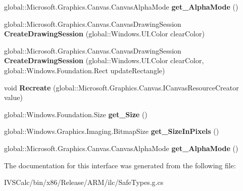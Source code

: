 \begin{DoxyCompactItemize}
global\+::\+Microsoft.\+Graphics.\+Canvas.\+Canvas\+Alpha\+Mode {\bfseries get\+\_\+\+Alpha\+Mode} ()
\item 
\mbox{\label{interface_microsoft_1_1_graphics_1_1_canvas_1_1_u_i_1_1_xaml_1_1_i_canvas_image_source_a2712dc7b5d96ee15e13c5e52958f1cd4}} 
global\+::\+Microsoft.\+Graphics.\+Canvas.\+Canvas\+Drawing\+Session {\bfseries Create\+Drawing\+Session} (global\+::\+Windows.\+U\+I.\+Color clear\+Color)
\item 
\mbox{\label{interface_microsoft_1_1_graphics_1_1_canvas_1_1_u_i_1_1_xaml_1_1_i_canvas_image_source_abc05c809912de3ae92ccfebc505385d6}} 
global\+::\+Microsoft.\+Graphics.\+Canvas.\+Canvas\+Drawing\+Session {\bfseries Create\+Drawing\+Session} (global\+::\+Windows.\+U\+I.\+Color clear\+Color, global\+::\+Windows.\+Foundation.\+Rect update\+Rectangle)
\item 
\mbox{\label{interface_microsoft_1_1_graphics_1_1_canvas_1_1_u_i_1_1_xaml_1_1_i_canvas_image_source_a15fd97a0021f7ecd409f478ba91e851c}} 
void {\bfseries Recreate} (global\+::\+Microsoft.\+Graphics.\+Canvas.\+I\+Canvas\+Resource\+Creator value)
\item 
\mbox{\label{interface_microsoft_1_1_graphics_1_1_canvas_1_1_u_i_1_1_xaml_1_1_i_canvas_image_source_a7d8bd30d0a04d8736e7b731f51beda90}} 
global\+::\+Windows.\+Foundation.\+Size {\bfseries get\+\_\+\+Size} ()
\item 
\mbox{\label{interface_microsoft_1_1_graphics_1_1_canvas_1_1_u_i_1_1_xaml_1_1_i_canvas_image_source_a0ac817b62686169754a46a9175fd1f94}} 
global\+::\+Windows.\+Graphics.\+Imaging.\+Bitmap\+Size {\bfseries get\+\_\+\+Size\+In\+Pixels} ()
\item 
\mbox{\label{interface_microsoft_1_1_graphics_1_1_canvas_1_1_u_i_1_1_xaml_1_1_i_canvas_image_source_af71f6e17450c14d8d80205d22900491c}} 
global\+::\+Microsoft.\+Graphics.\+Canvas.\+Canvas\+Alpha\+Mode {\bfseries get\+\_\+\+Alpha\+Mode} ()
\end{DoxyCompactItemize}


The documentation for this interface was generated from the following file\+:\begin{DoxyCompactItemize}
\item 
I\+V\+S\+Calc/bin/x86/\+Release/\+A\+R\+M/ilc/Safe\+Types.\+g.\+cs\end{DoxyCompactItemize}
